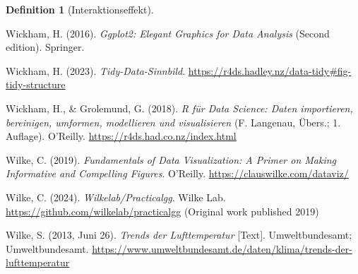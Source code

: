 \documentclass[
  letterpaper,
]{scrbook}
\newlength{\cslhangindent}
\newenvironment{CSLReferences}[2] %
 {\begin{list}{}{%
  \setlength{\itemindent}{0pt}
  \setlength{\leftmargin}{0pt}
  \setlength{\parsep}{0pt}
  \ifodd #1
   \setlength{\leftmargin}{\cslhangindent}
   \setlength{\itemindent}{-1\cslhangindent}
  \fi
  \setlength{\itemsep}{#2\baselineskip}}}
 {\end{list}}
\theoremstyle{definition}
\theoremstyle{definition}
\theoremstyle{definition}
\newtheorem{definition}{Definition}[chapter]
\theoremstyle{remark}
\begin{document}
\begin{definition}[Interaktionseffekt]
\begin{CSLReferences}{1}{0}
Wickham, H. (2016). \emph{Ggplot2: Elegant Graphics for Data Analysis}
(Second edition). Springer.

Wickham, H. (2023). \emph{Tidy-{Data-Sinnbild}}.
\url{https://r4ds.hadley.nz/data-tidy\#fig-tidy-structure}

Wickham, H., \& Grolemund, G. (2018). \emph{R für Data Science: Daten
importieren, bereinigen, umformen, modellieren und visualisieren} (F.
Langenau, Übers.; 1. Auflage). O'Reilly.
\url{https://r4ds.had.co.nz/index.html}

Wilke, C. (2019). \emph{Fundamentals of Data Visualization: A Primer on
Making Informative and Compelling Figures}. O'Reilly.
\url{https://clauswilke.com/dataviz/}

Wilke, C. (2024). \emph{Wilkelab/Practicalgg}. Wilke Lab.
\url{https://github.com/wilkelab/practicalgg} (Original work published
2019)

Wilke, S. (2013, Juni 26). \emph{Trends der Lufttemperatur} {[}Text{]}.
Umweltbundesamt; Umweltbundesamt.
\url{https://www.umweltbundesamt.de/daten/klima/trends-der-lufttemperatur}

\end{CSLReferences}

\end{definition}


\backmatter
\end{document}

